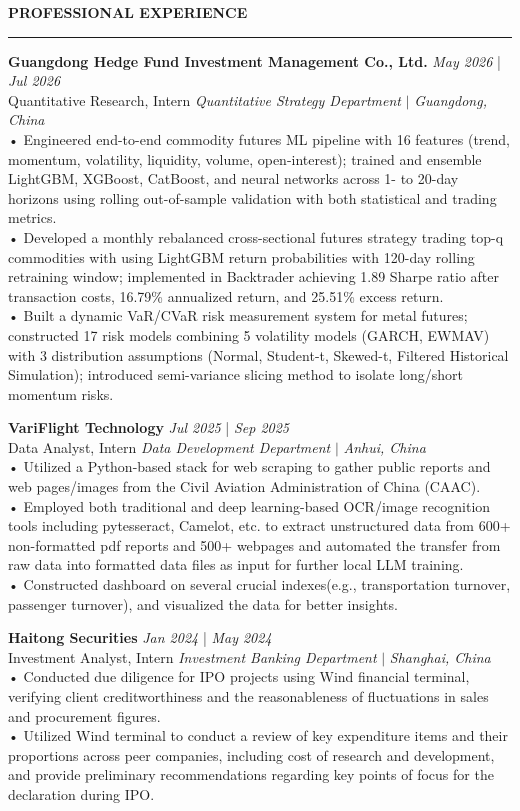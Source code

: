 \documentclass{resume} %
\renewcommand{\sectionskip}{\vspace{0.10cm}}        %
\renewcommand{\sectionlineskip}{\vspace{0.10cm}}
\renewenvironment{rSection}[1]{
\sectionskip
\textcolor{UC San Diego Blue}{\textbf{\large\bfseries\MakeUppercase{#1}}}

\sectionlineskip
\hrule
\begin{list}{}{
\setlength{\leftmargin}{0em}
}
\item[]
}{
\end{list}
}
\begin{document}
\begin{rSection}{PROFESSIONAL EXPERIENCE}
\noindent
\textbf{Guangdong Hedge Fund Investment Management Co., Ltd.} \hfill {\em May 2026} | {\em Jul 2026} \\
Quantitative Research, Intern \hfill \textit{Quantitative Strategy Department} $|$ \textit{Guangdong, China} \\[4pt]
• Engineered end-to-end commodity futures ML pipeline with 16 features (trend, momentum, volatility, liquidity, volume, open-interest); trained and ensemble LightGBM, XGBoost, CatBoost, and neural networks across 1- to 20-day horizons using rolling out-of-sample validation with both statistical and trading metrics.\\[1.5pt]    
• Developed a monthly rebalanced cross-sectional futures strategy trading top-q commodities with using LightGBM return probabilities with 120-day rolling retraining window; implemented in Backtrader achieving 1.89 Sharpe ratio after transaction costs, 16.79\% annualized return, and 25.51\% excess return.\\[1.5pt]
• Built a dynamic VaR/CVaR risk measurement system for metal futures; constructed 17 risk models combining 5 volatility models (GARCH, EWMAV) with 3 distribution assumptions (Normal, Student-t, Skewed-t, Filtered Historical Simulation); introduced semi-variance slicing method to isolate long/short momentum risks.

\textbf{VariFlight Technology} \hfill {\em Jul 2025} | {\em Sep 2025} \\
Data Analyst, Intern \hfill \textit{Data Development Department} $|$ \textit{Anhui, China} \\[4pt]
• Utilized a Python-based stack for web scraping to gather public reports and web pages/images from the Civil Aviation Administration of China (CAAC).\\[1.5pt]
• Employed both traditional and deep learning-based OCR/image recognition tools including pytesseract, Camelot, etc. to extract unstructured data from 600+ non-formatted pdf reports and 500+ webpages and automated the transfer from raw data into formatted data files as input for further local LLM training. \\[1.5pt]
• Constructed dashboard on several crucial indexes(e.g., transportation turnover, passenger turnover), and visualized the data for better insights.

\textbf{Haitong Securities} \hfill {\em Jan 2024} | {\em May 2024} \\
Investment Analyst, Intern \hfill \textit{Investment Banking Department} $|$ \textit{Shanghai, China} \\[4pt]
• Conducted due diligence for IPO projects using Wind financial terminal, verifying client creditworthiness and the reasonableness of fluctuations in sales and procurement figures.\\[1.5pt]
• Utilized Wind terminal to conduct a review of key expenditure items and their proportions across peer companies, including cost of research and development, and provide preliminary recommendations regarding key points of focus for the declaration during IPO.


\end{rSection}
\end{document}
